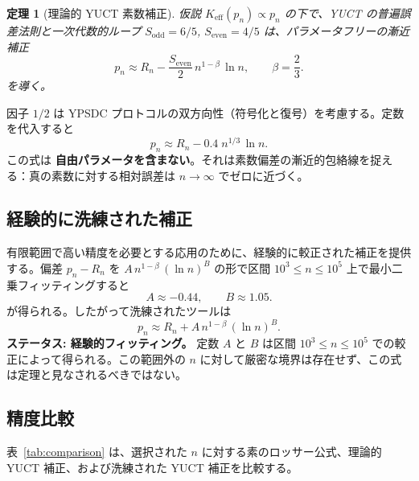 \documentclass[11pt,a4paper]{article}
\newtheorem{theorem}{定理}[section]
\newcommand{\Sodd}{S_{\mathrm{odd}}}
\newcommand{\Seven}{S_{\mathrm{even}}}
\begin{document}
	\begin{theorem}[理論的 YUCT 素数補正]\label{thm:yuct-prime-theory}
		仮説 \(K_{\mathrm{eff}}(p_n) \propto p_n\) の下で、YUCT の普遍誤差法則と一次代数的ループ \(\Sodd=6/5\), \(\Seven=4/5\) は、パラメータフリーの漸近補正
		\begin{equation}\label{eq:yuct-prime-theory}
			\boxed{ p_n \approx R_n - \frac{\Seven}{2}\, n^{1-\beta}\,\ln n },
			\qquad \beta = \frac{2}{3}.
		\end{equation}
		を導く。
	\end{theorem}
	
	因子 \(1/2\) は YPSDC プロトコルの双方向性（符号化と復号）を考慮する。定数を代入すると
	\[
	p_n \approx R_n - 0.4\; n^{1/3}\,\ln n .
	\]
	この式は \textbf{自由パラメータを含まない}。それは素数偏差の漸近的包絡線を捉える：真の素数に対する相対誤差は \(n\to\infty\) でゼロに近づく。
	
	\subsection{経験的に洗練された補正}
	有限範囲で高い精度を必要とする応用のために、経験的に較正された補正を提供する。偏差 \(p_n - R_n\) を \(A\,n^{1-\beta}\,(\ln n)^B\) の形で区間 \(10^3 \le n \le 10^5\) 上で最小二乗フィッティングすると
	\[
	A \approx -0.44, \qquad B \approx 1.05.
	\]
	が得られる。したがって洗練されたツールは
	\begin{equation}\label{eq:yuct-prime-empirical}
		\boxed{ p_n \approx R_n + A\,n^{1-\beta}\,(\ln n)^B }.
	\end{equation}
	\textbf{ステータス: 経験的フィッティング。} 定数 \(A\) と \(B\) は区間 \(10^3 \le n \le 10^5\) での較正によって得られる。この範囲外の \(n\) に対して厳密な境界は存在せず、この式は定理と見なされるべきではない。
	
	\subsection{精度比較}
	表~\ref{tab:comparison} は、選択された \(n\) に対する素のロッサー公式、理論的 YUCT 補正、および洗練された YUCT 補正を比較する。
	
\end{document}
